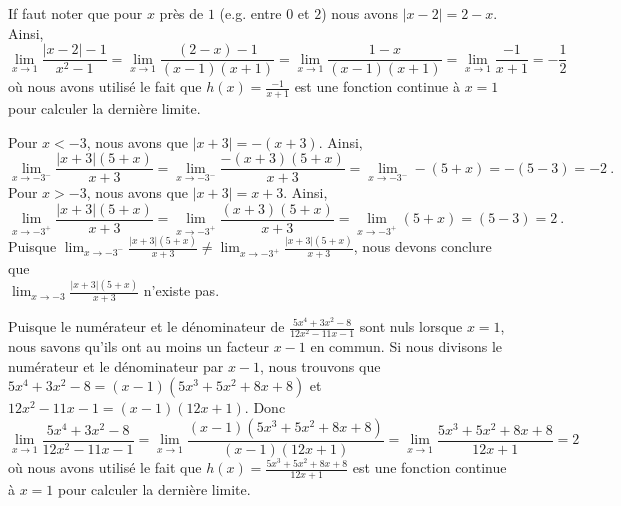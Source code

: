{ If faut noter que pour $x$ près de $1$ (e.g. entre $0$ et $2$)
nous avons $|x-2|= 2-x$.  Ainsi,
\[
\lim_{x\to 1} \frac{|x-2|-1}{x^2-1}
= \lim_{x\to 1} \frac{(2-x)-1}{(x-1)(x+1)}
= \lim_{x\to 1} \frac{1-x}{(x-1)(x+1)}
= \lim_{x\to 1} \frac{-1}{x+1} = -\frac{1}{2}
\]
où nous avons utilisé le fait que
$\displaystyle h(x) = \frac{-1}{x+1}$ est une fonction
continue à $x=1$ pour calculer la dernière limite.

 Pour $x<-3$, nous avons que $|x+3| = -(x+3)$.  Ainsi,
\[
\lim_{x\to -3^-} \frac{|x+3|(5+x)}{x+3}
= \lim_{x\to -3^-} \frac{-(x+3)(5+x)}{x+3}
= \lim_{x\to -3^-} -(5+x) = -(5-3) = -2 \ .
\]
Pour $x>-3$, nous avons que $|x+3| = x+3$.  Ainsi,
\[
\lim_{x\to -3^+} \frac{|x+3|(5+x)}{x+3}
= \lim_{x\to -3^+} \frac{(x+3)(5+x)}{x+3}
= \lim_{x\to -3^+} (5+x) = (5-3) = 2 \ .
\]
Puisque
$\displaystyle \lim_{x\to -3^-} \frac{|x+3|(5+x)}{x+3}
\neq \lim_{x\to -3^+} \frac{|x+3|(5+x)}{x+3}$, nous devons conclure que\\
$\displaystyle \lim_{x\to -3} \frac{|x+3|(5+x)}{x+3}$ n'existe pas.

 Puisque le numérateur et le dénominateur de
$\displaystyle \frac{5x^4 + 3x^2-8}{12x^2-11x-1}$ sont nuls lorsque
$x=1$, nous savons qu'ils ont au moins un facteur $x-1$ en commun.
Si nous divisons le numérateur et le dénominateur par $x-1$, nous trouvons que
$5x^4 + 3x^2-8  = (x-1)(5x^3+5x^2+8x+8)$ et
$12x^2-11x-1 = (x-1)(12x+1)$.  Donc
\[
\lim_{x\to 1} \frac{5x^4 + 3x^2-8}{12x^2-11x-1}
= \lim_{x\to 1} \frac{(x-1)(5x^3+5x^2+8x+8)}{(x-1)(12x+1)}
= \lim_{x\to 1} \frac{5x^3+5x^2+8x+8}{12x+1}
= 2
\]
où nous avons utilisé le fait que
$\displaystyle h(x) = \frac{5x^3+5x^2+8x+8}{12x+1}$ est une fonction
continue à $x=1$ pour calculer la dernière limite.
}



